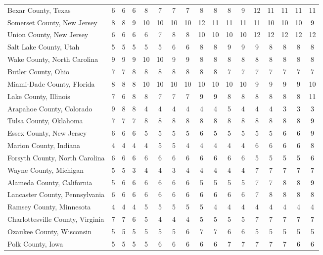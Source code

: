\begin{landscape}
\begin{longtable}{lcccccccccccccccc}
	Bexar County, Texas & 6 & 6 & 6 & 8 & 7 & 7 & 7 & 8 & 8 & 8 & 9 & 12 & 11 & 11 & 11 & 11 \\
	Somerset County, New Jersey & 8 & 8 & 9 & 10 & 10 & 10 & 10 & 12 & 11 & 11 & 11 & 11 & 10 & 10 & 10 & 9 \\
	Union County, New Jersey & 6 & 6 & 6 & 6 & 7 & 8 & 8 & 10 & 10 & 10 & 10 & 12 & 12 & 12 & 12 & 12 \\
	Salt Lake County, Utah & 5 & 5 & 5 & 5 & 5 & 6 & 6 & 8 & 8 & 9 & 9 & 9 & 8 & 8 & 8 & 8 \\
	Wake County, North Carolina & 9 & 9 & 9 & 10 & 10 & 9 & 9 & 8 & 8 & 8 & 8 & 8 & 8 & 8 & 8 & 8 \\
	Butler County, Ohio & 7 & 7 & 8 & 8 & 8 & 8 & 8 & 8 & 8 & 7 & 7 & 7 & 7 & 7 & 7 & 7 \\
	Miami-Dade County, Florida & 8 & 8 & 8 & 10 & 10 & 10 & 10 & 10 & 10 & 10 & 10 & 9 & 9 & 9 & 9 & 10 \\
	Lake County, Illinois & 7 & 6 & 8 & 8 & 7 & 7 & 7 & 9 & 9 & 8 & 8 & 8 & 8 & 8 & 8 & 11 \\
	Arapahoe County, Colorado & 9 & 8 & 8 & 4 & 4 & 4 & 4 & 4 & 4 & 5 & 4 & 4 & 4 & 3 & 3 & 3 \\
	Tulsa County, Oklahoma & 7 & 7 & 7 & 8 & 8 & 8 & 8 & 8 & 8 & 8 & 8 & 8 & 8 & 8 & 8 & 9 \\
	Essex County, New Jersey & 6 & 6 & 6 & 5 & 5 & 5 & 5 & 6 & 5 & 5 & 5 & 5 & 5 & 6 & 6 & 9 \\
	Marion County, Indiana & 4 & 4 & 4 & 4 & 5 & 5 & 4 & 4 & 4 & 4 & 4 & 6 & 6 & 6 & 6 & 8 \\
	Forsyth County, North Carolina & 6 & 6 & 6 & 6 & 6 & 6 & 6 & 6 & 6 & 6 & 6 & 5 & 5 & 5 & 5 & 6 \\
	Wayne County, Michigan & 5 & 5 & 3 & 4 & 4 & 3 & 4 & 4 & 4 & 4 & 4 & 7 & 7 & 7 & 7 & 7 \\
	Alameda County, California & 5 & 6 & 6 & 6 & 6 & 6 & 6 & 5 & 5 & 5 & 5 & 7 & 7 & 8 & 8 & 9 \\
	Lancaster County, Pennsylvania & 6 & 6 & 6 & 6 & 6 & 6 & 6 & 6 & 6 & 6 & 6 & 7 & 8 & 8 & 8 & 8 \\
	Ramsey County, Minnesota & 4 & 4 & 4 & 5 & 5 & 5 & 5 & 5 & 4 & 4 & 4 & 4 & 4 & 4 & 4 & 4 \\
	Charlottesville County, Virginia & 7 & 7 & 6 & 5 & 4 & 4 & 4 & 5 & 5 & 5 & 5 & 7 & 7 & 7 & 7 & 7 \\
	Ozaukee County, Wisconsin & 5 & 5 & 5 & 5 & 5 & 5 & 6 & 7 & 7 & 6 & 6 & 5 & 5 & 5 & 5 & 5 \\
	Polk County, Iowa & 5 & 5 & 5 & 5 & 6 & 6 & 6 & 6 & 6 & 7 & 7 & 7 & 7 & 7 & 6 & 6 \\

\end{longtable}
\end{landscape}
